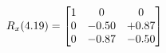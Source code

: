 \documentclass[preview]{standalone}
\begin{document}
\begin{align*}
\special{dvisvgm:raw <g id='unique000'>}R_{x}(4.19) = \begin{bmatrix}1 & 0 & 0 \\0 & -0.50 & +0.87 \\0 & -0.87 & -0.50\end{bmatrix}\special{dvisvgm:raw </g>}
\end{align*}
\end{document}
